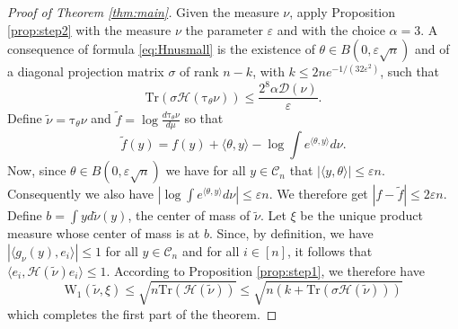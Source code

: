 \documentclass[12pt]{article}
\def \tilt{ \mathrm{\tau} }
\def \W{\mathrm{W_1}}
\def \eps {\varepsilon}
\def \tr {\mathrm{Tr}}
\def \DC {\mathcal{C}_n}
\def \HH {\mathcal{H}}
\def \Comp { \mathcal{D} }
\theoremstyle{definition}
\theoremstyle{remark}
\begin{document}
\begin{proof}[Proof of Theorem \ref{thm:main}]
Given the measure $\nu$, apply Proposition \ref{prop:step2} with the measure $\nu$ the parameter $\eps$ and with the choice $\alpha=3$. A consequence of formula \eqref{eq:Hnusmall} is the existence of $\theta \in B(0, \eps \sqrt{n})$ and of a diagonal projection matrix $\sigma$ of rank $n-k$, with $k \leq 2 n e^{-1/(32 \eps^2)}$, such that
$$
\tr(\sigma \HH(\tilt_\theta \nu)) \leq \frac{2^8 \alpha \Comp(\nu)}{\eps}.
$$
Define $\tilde \nu = \tilt_\theta \nu$ and $\tilde f = \log \frac{d \tilt_\theta \nu}{d \mu}$ so that
$$
\tilde f(y) = f(y) + \langle \theta, y \rangle - \log \int e^{\langle \theta, y \rangle} d \nu.
$$
Now, since $\theta \in B(0, \eps \sqrt{n})$ we have for all $y \in \DC$ that $|\langle y, \theta \rangle| \leq \eps n$. Consequently we also have $\left |\log \int e^{\langle \theta, y \rangle} d \nu \right | \leq \eps n$. We therefore get $|f - \tilde f| \leq 2 \eps n$. \\

Define $b = \int y d \tilde \nu(y)$, the center of mass of $\tilde \nu$. Let $\xi$ be the unique product measure whose center of mass is at $b$. Since, by definition, we have $|\langle g_\nu(y), e_i \rangle| \leq 1$ for all $y \in \DC$ and for all $i \in [n]$, it follows that $\langle e_i, \HH(\tilde \nu) e_i \rangle \leq 1$. According to Proposition \ref{prop:step1}, we therefore have
$$
\W(\tilde \nu, \xi) \leq \sqrt{n \tr(\HH(\tilde \nu))} \leq \sqrt{n \left (k+ \tr(\sigma \HH(\tilde \nu) ) \right ) }  
$$
which completes the first part of the theorem.


\end{proof}
\end{document}
